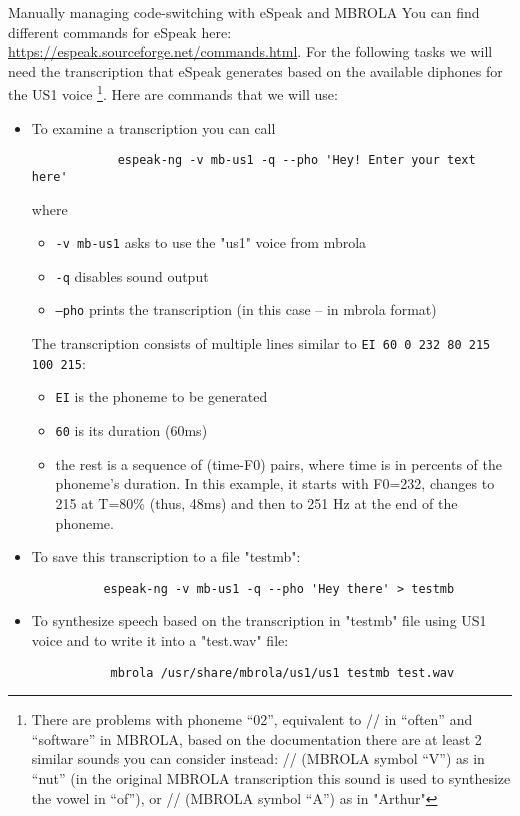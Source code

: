 \documentclass{../labbook}
\begin{document}
\begin{problem}{2}{10}{Manually managing code-switching with eSpeak and MBROLA}
You can find different commands for eSpeak here: \href{https://espeak.sourceforge.net/commands.html}{https://espeak.sourceforge.net/commands.html}.
For the following tasks we will need the transcription that eSpeak generates based on the available diphones for the US1 voice \footnote{There are problems with phoneme ``02'', equivalent to // in “often” and “software” in MBROLA, based on the documentation there are at least 2 similar sounds you can consider instead: // (MBROLA symbol “V”) as in “nut” (in the original MBROLA transcription this sound is used to synthesize the vowel in “of”), or // (MBROLA symbol “A”) as in "Arthur"}. 
Here are commands that we will use:
\begin{itemize}
    \item To examine a transcription you can call 
        \begin{verbatim} 
            espeak-ng -v mb-us1 -q --pho 'Hey! Enter your text here'
        \end{verbatim} where 
        \begin{itemize}
            \item \texttt{-v mb-us1} asks to use the "us1" voice from mbrola
            \item \texttt{-q} disables sound output
            \item  \texttt{--pho} prints the transcription (in this case -- in mbrola format)
        \end{itemize}
                
      
      The transcription consists of multiple lines similar to \texttt{EI	60	 0 232 80 215 100 215}:
      \begin{itemize}
          \item \texttt{EI} is the phoneme to be generated
          \item \texttt{60} is its duration (60ms)
          \item the rest is a sequence of (time-F0) pairs, where time is in percents of the phoneme's duration. In this example, it starts with F0=232, changes to 215 at T=80\% (thus, 48ms) and then to 251 Hz at the end of the phoneme.
      \end{itemize}

    \item To save this transcription to a file "testmb":
          \begin{verbatim}
          espeak-ng -v mb-us1 -q --pho 'Hey there' > testmb  
          \end{verbatim}
    \item To synthesize speech based on the transcription in "testmb" file using          US1 voice and to write it into a "test.wav" file:
          \begin{verbatim}
           mbrola /usr/share/mbrola/us1/us1 testmb test.wav   
          \end{verbatim}
\end{itemize}
    

\end{problem}
\end{document}
